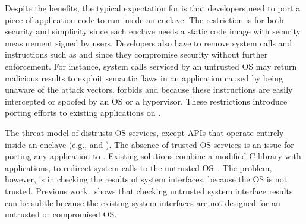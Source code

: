 Despite the benefits,
the typical expectation for \sgx{} is
that developers need to port a piece of application code to run inside an enclave.
The restriction is for both security and simplicity
since each enclave
needs a static code image with 
security measurement
signed by users.
Developers also have to remove system calls and
instructions such as  and 
since they compromise
security without further enforcement.
For instance,
system calls serviced by an untrusted OS
may return malicious results to exploit semantic flaws in an application caused by being unaware of the attack vectors.
\sgx{} forbids  and  because these instructions are easily intercepted or spoofed by an OS
or a hypervisor.
These restrictions introduce porting efforts to existing applications on \sgx{}.



The threat model of \sgx{} distrusts OS services, except APIs that operate entirely inside an enclave (e.g.,  and ).
The absence of trusted OS services is an issue for porting any application to \sgx{}.
Existing solutions combine a modified C library with applications, to redirect system calls
to the untrusted OS~\cite{osdi16scone,shinde17panoply}.
The problem, however, is in checking the results of system interfaces, because the OS is not trusted. %
Previous work~\cite{checkoway13iago} shows that
checking untrusted system interface results can be subtle because the existing system interfaces are not designed for an untrusted or compromised OS.


